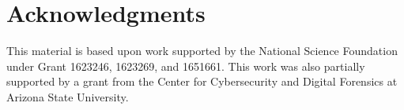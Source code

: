 \section*{Acknowledgments}

This material is based upon work supported by the National Science Foundation under Grant 1623246, 1623269, and 1651661.
This work was also partially supported by a grant from the Center for Cybersecurity and Digital Forensics at Arizona State University.
